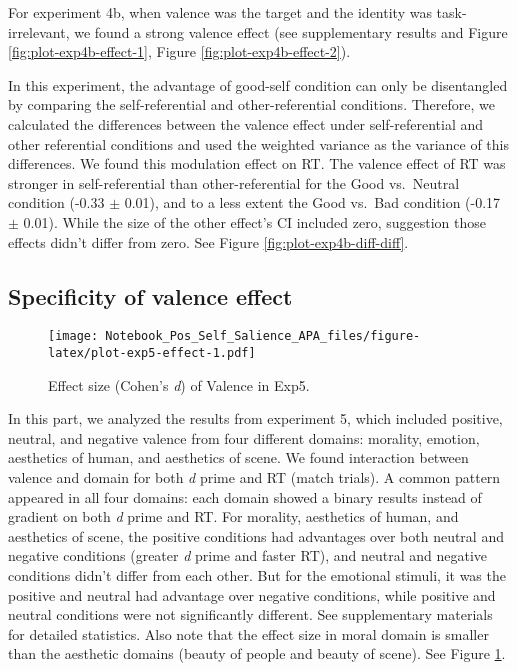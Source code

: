\documentclass[
  english,
  man]{apa6}
\begin{document}
For experiment 4b, when valence was the target and the identity was task-irrelevant, we found a strong valence effect (see supplementary results and Figure \ref{fig:plot-exp4b-effect-1}, Figure \ref{fig:plot-exp4b-effect-2}).

In this experiment, the advantage of good-self condition can only be disentangled by comparing the self-referential and other-referential conditions. Therefore, we calculated the differences between the valence effect under self-referential and other referential conditions and used the weighted variance as the variance of this differences. We found this modulation effect on RT. The valence effect of RT was stronger in self-referential than other-referential for the Good vs.~Neutral condition (-0.33 \(\pm\) 0.01), and to a less extent the Good vs.~Bad condition (-0.17 \(\pm\) 0.01). While the size of the other effect's CI included zero, suggestion those effects didn't differ from zero. See Figure \ref{fig:plot-exp4b-diff-diff}.

\hypertarget{specificity-of-valence-effect}{%
\subsection{Specificity of valence effect}\label{specificity-of-valence-effect}}

\begin{figure}
\centering
\texttt{[image: Notebook\_Pos\_Self\_Salience\_APA\_files/figure-latex/plot-exp5-effect-1.pdf]}
\caption{\label{fig:plot-exp5-effect}Effect size (Cohen's \emph{d}) of Valence in Exp5.}
\end{figure}

In this part, we analyzed the results from experiment 5, which included positive, neutral, and negative valence from four different domains: morality, emotion, aesthetics of human, and aesthetics of scene. We found interaction between valence and domain for both \emph{d} prime and RT (match trials). A common pattern appeared in all four domains: each domain showed a binary results instead of gradient on both \emph{d} prime and RT. For morality, aesthetics of human, and aesthetics of scene, the positive conditions had advantages over both neutral and negative conditions (greater \emph{d} prime and faster RT), and neutral and negative conditions didn't differ from each other. But for the emotional stimuli, it was the positive and neutral had advantage over negative conditions, while positive and neutral conditions were not significantly different. See supplementary materials for detailed statistics. Also note that the effect size in moral domain is smaller than the aesthetic domains (beauty of people and beauty of scene). See Figure \ref{fig:plot-exp5-effect}.
\end{document}

